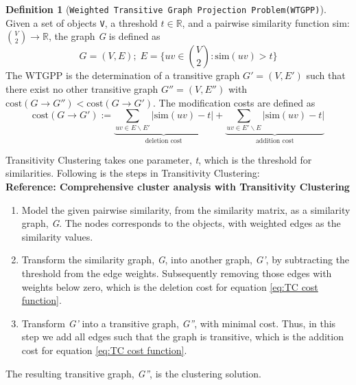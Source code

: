 \documentclass[a4paper,10pt]{article}
\theoremstyle{plain}
\theoremstyle{definition}
\newtheorem{defn}{Definition}
\begin{document}
\begin{defn}[\texttt{Weighted Transitive Graph Projection Problem(WTGPP)}]\label{def:WTGPP}
	 Given a set of objects \texttt{V}, a threshold $t \in \mathbb{R}$, and a pairwise similarity function sim: ${V \choose 2} \rightarrow \mathbb{R}$, the graph \textit{G} is defined as
	 \begin{equation}\label{eq:sim above threshold}
	 G = (V, E); \; E = \bigg\{ uv \in {V \choose 2} : \text{sim}(uv) > t\bigg\}
	 \end{equation}
	 The WTGPP is the determination of a transitive graph $G' = (V, E')$ such that there exist no other transitive graph $G'' = (V, E'')$ with $\text{cost}(G \rightarrow G'') < \text{cost}(G \rightarrow G')$. The modification costs are defined as
	 \begin{equation}\label{eq:TC cost function}
		 \text{cost}(G \rightarrow G') := \underbrace{\sum_{uv \in E \backslash E'} | \text{sim}(uv) - t |}_{\text{deletion cost}} + \underbrace{\sum_{uv \in E' \backslash E} | \text{sim}(uv) - t |}_{\text{addition cost}}
	 \end{equation}
\end{defn}


Transitivity Clustering takes one parameter, \textit{t}, which is the threshold for similarities. Following is the steps in Transitivity Clustering: \\
\textbf{Reference: Comprehensive cluster analysis with Transitivity Clustering}
\begin{enumerate}
	\item Model the given pairwise similarity, from the similarity matrix, as a similarity graph, \textit{G}. The nodes corresponds to the objects, with weighted edges as the similarity values.
	
	\item Transform the similarity graph, \textit{G}, into another graph, \textit{G'}, by subtracting the threshold from the edge weights. Subsequently removing those edges with weights below zero, which is the deletion cost for equation \ref{eq:TC cost function}.
	
	\item Transform \textit{G'} into a transitive graph, \textit{G''}, with minimal cost. Thus, in this step we add all edges such that the graph is transitive, which is the addition cost for equation \ref{eq:TC cost function}.
\end{enumerate}
The resulting transitive graph, \textit{G''}, is the clustering solution.
\end{document}
